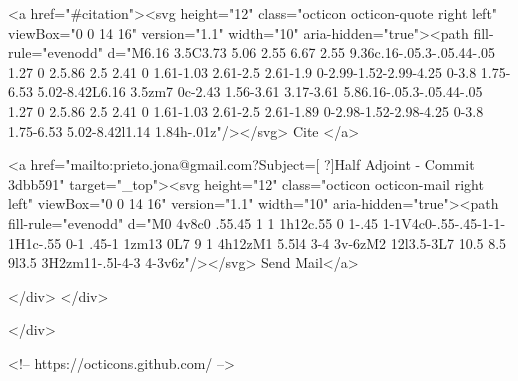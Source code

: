       <a  href="#citation"><svg height="12" class="octicon octicon-quote right left" viewBox="0 0 14 16" version="1.1" width="10" aria-hidden="true"><path fill-rule="evenodd" d="M6.16 3.5C3.73 5.06 2.55 6.67 2.55 9.36c.16-.05.3-.05.44-.05 1.27 0 2.5.86 2.5 2.41 0 1.61-1.03 2.61-2.5 2.61-1.9 0-2.99-1.52-2.99-4.25 0-3.8 1.75-6.53 5.02-8.42L6.16 3.5zm7 0c-2.43 1.56-3.61 3.17-3.61 5.86.16-.05.3-.05.44-.05 1.27 0 2.5.86 2.5 2.41 0 1.61-1.03 2.61-2.5 2.61-1.89 0-2.98-1.52-2.98-4.25 0-3.8 1.75-6.53 5.02-8.42l1.14 1.84h-.01z"/></svg> Cite
      </a>

      <a href="mailto:prieto.jona@gmail.com?Subject=[ ?]Half Adjoint - Commit 3dbb591" target="_top"><svg height="12" class="octicon octicon-mail right left" viewBox="0 0 14 16" version="1.1" width="10" aria-hidden="true"><path fill-rule="evenodd" d="M0 4v8c0 .55.45 1 1 1h12c.55 0 1-.45 1-1V4c0-.55-.45-1-1-1H1c-.55 0-1 .45-1 1zm13 0L7 9 1 4h12zM1 5.5l4 3-4 3v-6zM2 12l3.5-3L7 10.5 8.5 9l3.5 3H2zm11-.5l-4-3 4-3v6z"/></svg> Send Mail</a>

    </div>
  </div>

</div>

<!-- https://octicons.github.com/ -->





